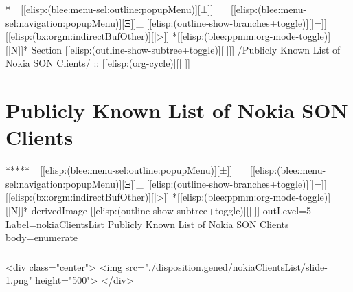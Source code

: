 

\begin{whenOrg}
*  _[[elisp:(blee:menu-sel:outline:popupMenu)][±]]_ _[[elisp:(blee:menu-sel:navigation:popupMenu)][Ξ]]_ [[elisp:(outline-show-branches+toggle)][|=]] [[elisp:(bx:orgm:indirectBufOther)][|>]] *[[elisp:(blee:ppmm:org-mode-toggle)][|N]]*  Section    [[elisp:(outline-show-subtree+toggle)][||]]   /Publicly Known List of Nokia SON Clients/ ::  [[elisp:(org-cycle)][| ]]
\end{whenOrg}

\section{Publicly Known List of Nokia SON Clients}


\begin{whenOrg}
*****  _[[elisp:(blee:menu-sel:outline:popupMenu)][±]]_ _[[elisp:(blee:menu-sel:navigation:popupMenu)][Ξ]]_ [[elisp:(outline-show-branches+toggle)][|=]] [[elisp:(bx:orgm:indirectBufOther)][|>]] *[[elisp:(blee:ppmm:org-mode-toggle)][|N]]*  derivedImage [[elisp:(outline-show-subtree+toggle)][||]] outLevel=5 Label=nokiaClientsList Publicly Known List of Nokia SON Clients body=enumerate
\end{whenOrg}

\begin{htmlonly}

\begin{frame}[fragile,plain,label=nokiaClientsList]
    \frametitle{}
    \framesubtitle{}
    \begin{rawhtml}
<div class="center">
<img src="./disposition.gened/nokiaClientsList/slide-1.png" height="500">
</div>
    \end{rawhtml}
\end{frame}
\end{htmlonly}

